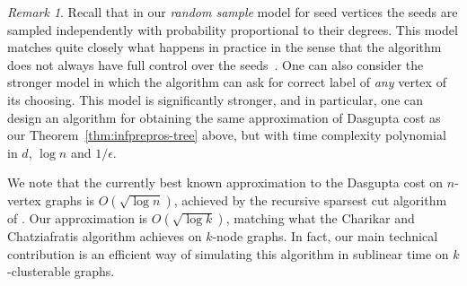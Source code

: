 \documentclass[letterpaper,11pt]{article}
\theoremstyle{plain}
\theoremstyle{definition}
\theoremstyle{remark}
\newtheorem{remark}[theorem]{Remark}
\begin{document}
\begin{remark}
Recall that in our {\em random sample} model for seed vertices the seeds are sampled independently with probability proportional to their degrees.  This model matches quite closely what happens in practice in the sense that the algorithm does not always have full control over the seeds~\cite{basu2002semi}. One can also consider the stronger model in which the algorithm can ask for correct label of {\em any} vertex of its choosing. This model is significantly stronger, and in particular, one can design an algorithm for obtaining the same approximation of Dasgupta cost as our Theorem~\ref{thm:infprepros-tree} above, but with time complexity polynomial in $d$, $\log n$ and $1/\epsilon$.
\end{remark}


We note that the currently best known approximation to the Dasgupta cost on $n$-vertex graphs is $O(\sqrt{\log n})$, achieved by the recursive sparsest cut algorithm of \cite{charikar2017approximate}. Our approximation is $O(\sqrt{\log k})$, matching what the Charikar and Chatziafratis algorithm achieves on $k$-node graphs. In fact, our main technical contribution is an efficient way of simulating this algorithm in sublinear time on $k$-clusterable graphs.
\end{document}
